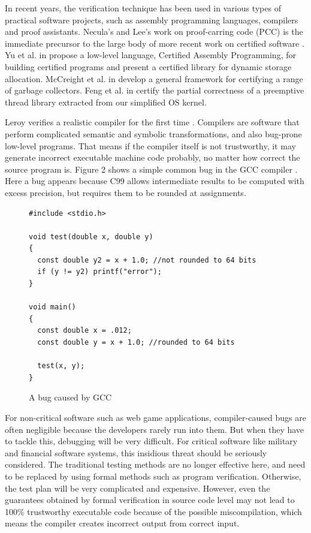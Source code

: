 \documentclass[10pt, conference, compsocconf]{IEEEtran}
\begin{document}
In recent years, the verification technique has been used in various types of practical software projects, such as assembly programming languages, compilers and proof assistants. Necula's and Lee's work on proof-carring code (PCC) is the immediate precursor to the large body of more recent work on certified software \cite{Necula}. Yu et al. in \cite{CAP} propose a low-level language, Certified Assembly Programming, for building certified programs and present a certified library for dynamic storage allocation. McCreight et al. in \cite{garbage} develop a general framework for certifying a range of garbage collectors. Feng et al. in \cite{thread} certify the partial correctness of a preemptive thread library extracted from our simplified OS kernel.  



Leroy verifies a realistic compiler for the first time \cite{compiler}. Compilers are software that perform complicated semantic and symbolic transformations, and also bug-prone low-level programs. That means if the compiler itself is not trustworthy, it may generate incorrect executable machine code probably, no matter how correct the source program is. Figure 2 shows a simple common bug in the GCC compiler \cite{gccbug}. Here a bug appears because C99 allows intermediate results to be computed with excess precision, but requires them to be rounded at assignments.

\begin{figure}[H]
\begin{lstlisting}[label=gccbug]
#include <stdio.h>

void test(double x, double y)
{
  const double y2 = x + 1.0; //not rounded to 64 bits
  if (y != y2) printf("error");
}

void main()
{
  const double x = .012;
  const double y = x + 1.0; //rounded to 64 bits

  test(x, y);
}
\end{lstlisting}
\caption{A bug caused by GCC}
\end{figure}

For non-critical software such as web game applications, compiler-caused bugs are often negligible because the developers rarely run into them. But when they have to tackle this, debugging will be very difficult. For critical software like military and financial software systems, this insidious threat should be seriously considered. The traditional testing methods are no longer effective here, and need to be replaced by using formal methods such as program verification. Otherwise, the test plan will be very complicated and expensive. However, even the guarantees obtained by formal verification in source code level may not lead to 100\% trustworthy executable code because of the possible miscompilation, which means the compiler creates incorrect output from correct input.
\end{document}
